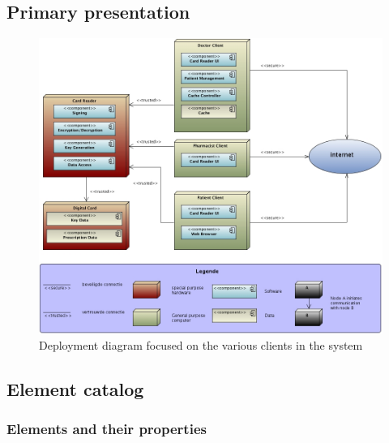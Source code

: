 \documentclass[a4paper,10pt]{article}
\begin{document}
\subsection{Primary presentation}
\begin{center}
    \begin{figure}[!h]
      \includegraphics[width=\textwidth]{../images/deployment_clients.jpg}
	\caption{Deployment diagram focused on the various clients in the system}
    \end{figure}
  \end{center}

\subsection{Element catalog}

\subsubsection{Elements and their properties}
\end{document}

